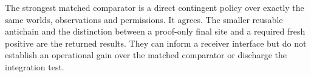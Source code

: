 \documentclass[11pt]{article}
\begin{document}
The strongest matched comparator is a direct contingent policy over exactly the same worlds, observations and permissions. It agrees. The smaller reusable antichain and the distinction between a proof-only final site and a required fresh positive are the returned results. They can inform a receiver interface but do not establish an operational gain over the matched comparator or discharge the integration test.
\end{document}
